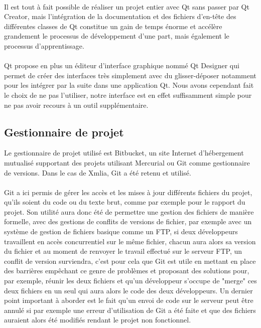 \paragraph{}
Il est tout à fait possible de réaliser un projet entier avec Qt sans passer par Qt Creator, mais l'intégration de la documentation et des fichiers d'en-tête des différentes classes de Qt constitue un gain de temps énorme et accélère grandement le processus de développement d'une part, mais également le processus d'apprentissage.
\paragraph{}
Qt propose en plus un éditeur d'interface graphique nommé Qt Designer qui permet de créer des interfaces très simplement avec du glisser-déposer notamment pour les intégrer par la suite dans une application Qt. Nous avons cependant fait le choix de ne pas l'utiliser, notre interface est en effet suffisamment simple pour ne pas avoir recours à un outil supplémentaire.

\subsection{Gestionnaire de projet}
Le gestionnaire de projet utilisé est Bitbucket, un site Internet d'hébergement mutualisé supportant des projets utilisant Mercurial ou Git comme gestionnaire de versions. Dans le cas de Xmlia, Git a été retenu et utilisé.
\paragraph{}
Git a ici permis de gérer les accès et les mises à jour différents fichiers du projet, qu'ils soient du code ou du texte brut, comme par exemple pour le rapport du projet. Son utilité aura donc été de permettre une gestion des fichiers de manière formelle, avec des gestions de conflits de versions de fichier, par exemple avec un système de gestion de fichiers basique comme un FTP, si deux développeurs travaillent en accès concurrentiel sur le même fichier, chacun aura alors sa version du fichier et au moment de renvoyer le travail effectué sur le serveur FTP, un conflit de version surviendra, c'est pour cela que Git est utile en mettant en place des barrières empêchant ce genre de problèmes et proposant des solutions pour, par exemple, réunir les deux fichiers et qu'un développeur s'occupe de "merge" ces deux fichiers en un seul qui aura alors le code des deux développeurs. Un dernier point important à aborder est le fait qu'un envoi de code sur le serveur peut être annulé si par exemple une erreur d'utilisation de Git a été faite et que des fichiers auraient alors été modifiés rendant le projet non fonctionnel.
